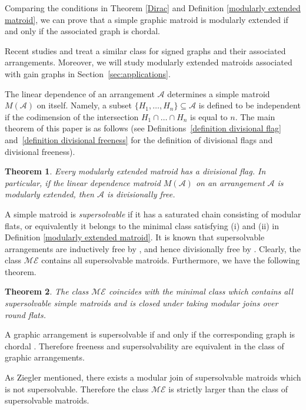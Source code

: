 \documentclass[pdftex]{sigma}
\numberwithin{equation}{section}
\newtheorem{Theorem}{Theorem}[section]
\begin{document}
Comparing the conditions in Theorem \ref{Dirac} and Definition \ref{modularly extended matroid}, we can prove that a simple graphic matroid is modularly extended if and only if the associated graph is chordal.

Recent studies \cite{suyama2019signed-dm} and \cite{torielli2020freeness-a} treat a similar class for signed graphs and their associated arrangements.
Moreover, we will study modularly extended matroids associated with gain graphs in Section~\ref{sec:applications}.


The linear dependence of an arrangement $ \mathcal{A} $ determines a simple matroid $ M(\mathcal{A}) $ on itself.
Namely, a subset $ \{H_{1}, \dots, H_{n}\} \subseteq \mathcal{A} $ is defined to be independent if the codimension of the intersection $ H_{1} \cap \dots \cap H_{n} $ is equal to $ n $.
The main theorem of this paper is as follows (see Definitions~\ref{definition divisional flag} and~\ref{definition divisional freeness} for the definition of divisional flags and divisional freeness).
\begin{Theorem}\label{main divisionally free}
Every modularly extended matroid has a divisional flag. In particular, if the linear dependence matroid $ M(\mathcal{A}) $ on an arrangement $ \mathcal{A} $ is modularly extended, then $ \mathcal{A} $ is divisionally free.
\end{Theorem}

A simple matroid is \textit{supersolvable} if it has a saturated chain consisting of modular flats, or equivalently it belongs to the minimal class satisfying (i) and (ii) in Definition \ref{modularly extended matroid}.
It is known that supersolvable arrangements are inductively free by \cite[Theorem 4.2]{jambu1984free-aim}, and hence divisionally free by \cite[Theorem~1.6]{abe2016divisionally-im}.
Clearly, the class $ \mathcal{ME} $ contains all supersolvable matroids.
Furthermore, we have the following theorem.
\begin{Theorem}\label{main ss}
The class $ \mathcal{ME} $ coincides with the minimal class which contains all supersolvable simple matroids and is closed under taking modular joins over round flats.
\end{Theorem}

A graphic arrangement is supersolvable if and only if the corresponding graph is chordal \cite[Proposition~2.8]{stanley1972supersolvable-au}. Therefore freeness and supersolvability are equivalent in the class of graphic arrangements.

As Ziegler \cite{ziegler1991binary-potams} mentioned, there exists a modular join of supersolvable matroids which is not supersolvable.
Therefore the class $ \mathcal{ME} $ is strictly larger than the class of supersolvable matroids.
\end{document}
